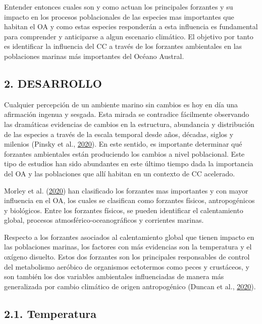 \documentclass[
]{article}
\begin{document}
Entender entonces cuales son y como actuan los principales forzantes y
su impacto en los procesos poblacionales de las especies mas importantes
que habitan el OA y como estas especies responderán a esta influencia es
fundamental para comprender y anticiparse a algun escenario climático.
El objetivo por tanto es identificar la influencia del CC a través de
los forzantes ambientales en las poblaciones marinas más importantes del
Océano Austral.

\pagebreak

\hypertarget{desarrollo}{%
\subsection{2. DESARROLLO}\label{desarrollo}}

Cualquier percepción de un ambiente marino sin cambios es hoy en día una
afirmación ingenua y sesgada. Esta mirada se contradice fácilmente
observando las dramáticas evidencias de cambios en la estructura,
abundancia y distribución de las especies a través de la escala temporal
desde años, décadas, siglos y milenios (Pinsky et al.,
\protect\hyperlink{ref-Pinsky2020}{2020}). En este sentido, es
importante determinar qué forzantes ambientales están produciendo los
cambios a nivel poblacional. Este tipo de estudios han sido abundantes
en este último tiempo dada la importancia del OA y las poblaciones que
allí habitan en un contexto de CC acelerado.

Morley et al. (\protect\hyperlink{ref-Morley2020}{2020}) han clasificado
los forzantes mas importantes y con mayor influencia en el OA, los
cuales se clasifican como forzantes físicos, antropogénicos y
biológicos. Entre los forzantes físicos, se pueden identificar el
calentamiento global, procesos atmosférico-oceanográficos y corrientes
marinas.

Respecto a los forzantes asociados al calentamiento global que tienen
impacto en las poblaciones marinas, los factores con más evidencias son
la temperatura y el oxígeno disuelto. Estos dos forzantes son los
principales responsables de control del metabolismo aeróbico de
organismos ectotermos como peces y crustáceos, y son también los dos
variables ambientales influenciadas de manera más generalizada por
cambio climático de origen antropogénico (Duncan et al.,
\protect\hyperlink{ref-Duncan2020}{2020}).

\hypertarget{temperatura}{%
\subsection{2.1. Temperatura}\label{temperatura}}
\end{document}
